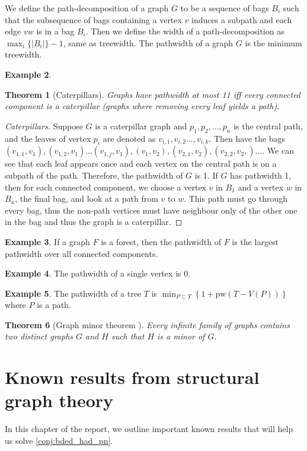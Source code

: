 \documentclass[]{report}
\newcommand{\pw}{\text{pw}}
\newtheorem{theorem}{Theorem}
\theoremstyle{definition}
\newtheorem{example}[theorem]{Example}
\numberwithin{theorem}{section}
\numberwithin{equation}{section}
\begin{document}
We define the path-decomposition of a graph $G$ to be a sequence of bags $B_i$ such that the subsequence of bags containing a vertex $v$ induces a subpath and each edge $vw$ is in a bag $B_i$. Then we define the width of a path-decomposition as $\max_i \lbrace |B_i| \rbrace -1$, same as treewidth. The pathwidth of a graph $G$ is the minimum treewidth.
\begin{example}
	\begin{theorem}[Caterpillars]
		Graphs have pathwidth at most 11 iff every connected component is a caterpillar (graphs where removing every leaf yields a path).
	\end{theorem}
	\begin{proof}[Caterpillars]
		Suppose $G$ is a caterpillar graph and $p_1, p_2, ..., p_n$ is the central path, and the leaves of vertex $p_i$ are denoted as $v_{i, 1}, v_{i, 2} ..., v_{i, k}$. Then have the bags $(v_{1, 1}, v_1), (v_{1, 2}, v_1)... (v_{1, j}, v_1), (v_1, v_2), (v_{2, 1}, v_2), (v_{2,2}, v_2,)... $. We can see that each leaf appears once and each vertex on the central path is on a subpath of the path. Therefore, the pathwidth of $G$ is 1. If $G$ has pathwidth 1, then for each connected component, we choose a vertex $v$ in $B_1$ and a vertex $w$ in $B_n$, the final bag, and look at a path from $v$ to $w$. This path must go through every bag, thus the non-path vertices must have neighbour only of the other one in the bag and thus the graph is a caterpillar. 
	\end{proof}
	
\end{example}
\begin{example}
	If a graph $F$ is a forest, then the pathwidth of $F$ is the largest pathwidth over all connected components.
\end{example}
\begin{example}
	The pathwidth of a single vertex is 0.
\end{example}
\begin{example}
	The pathwidth of a tree $T$ is $\min_{P \subset T} \left\lbrace 1 + \pw(T - V(P))\right\rbrace $ where $P$ is a path. 
\end{example}

\begin{theorem}[Graph minor theorem \cite{robertsonGraphMinorsXX2004}]
	Every infinite family of graphs contains two distinct graphs $G$ and $H$ such that $H$ is a minor of $G$.
\end{theorem}

\chapter{Known results from structural graph theory}\label{chap:Known results}
In this chapter of the report, we outline important known results that will help us solve \cref{conj:bded_had_pn}.
\end{document}
